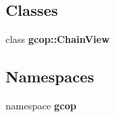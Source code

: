 \subsection*{\-Classes}
\begin{DoxyCompactItemize}
\item 
class {\bf gcop\-::\-Chain\-View}
\end{DoxyCompactItemize}
\subsection*{\-Namespaces}
\begin{DoxyCompactItemize}
\item 
namespace {\bf gcop}
\end{DoxyCompactItemize}
